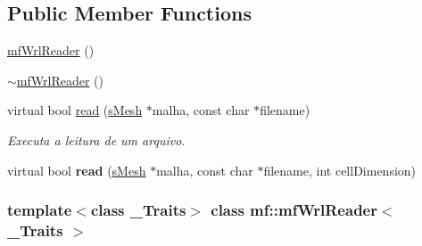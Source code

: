 \subsection*{Public Member Functions}
\begin{DoxyCompactItemize}
\item 
\hyperlink{classmf_1_1mfWrlReader_ac2a051b741b46ce2a41d2214a577e6b9}{mfWrlReader} ()
\item 
\hyperlink{classmf_1_1mfWrlReader_abb6561454375e4c8eb4d5f8ebb7e387b}{$\sim$mfWrlReader} ()
\item 
virtual bool \hyperlink{classmf_1_1mfWrlReader_a1d4c505e8e62204674aba4a36d47751e}{read} (\hyperlink{classmf_1_1mfWrlReader_a00a23984c72a850fbc105870596d6d78}{sMesh} $\ast$malha, const char $\ast$filename)
\begin{DoxyCompactList}\small\item\em Executa a leitura de um arquivo. \item\end{DoxyCompactList}\item 
\hypertarget{classmf_1_1mfWrlReader_a1962f16e07139e934a6b7c0dc6efd8a0}{
virtual bool {\bfseries read} (\hyperlink{classmf_1_1mfWrlReader_a00a23984c72a850fbc105870596d6d78}{sMesh} $\ast$malha, const char $\ast$filename, int cellDimension)}
\label{classmf_1_1mfWrlReader_a1962f16e07139e934a6b7c0dc6efd8a0}

\end{DoxyCompactItemize}
\subsubsection*{template$<$class \_\-Traits$>$ class mf::mfWrlReader$<$ \_\-Traits $>$}



